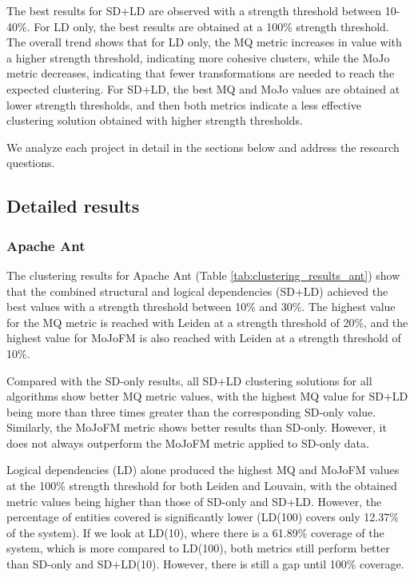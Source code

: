 \documentclass[12pt, a4paper, twoside]{report}
\begin{document}
The best results for SD+LD are observed with a strength threshold between 10-40\%. For LD only, the best results are obtained at a 100\% strength threshold. The overall trend shows that for LD only, the MQ metric increases in value with a higher strength threshold, indicating more cohesive clusters, while the MoJo metric decreases, indicating that fewer transformations are needed to reach the expected clustering. For SD+LD, the best MQ and MoJo values are obtained at lower strength thresholds, and then both metrics indicate a less effective clustering solution obtained with higher strength thresholds.

We analyze each project in detail in the sections below and address the research questions.

\subsection{Detailed results}

\subsubsection{Apache Ant}

The clustering results for Apache Ant (Table \ref{tab:clustering_results_ant}) show that the combined structural and logical dependencies (SD+LD) achieved the best values with a strength threshold between 10\% and 30\%. The highest value for the MQ metric is reached with Leiden at a strength threshold of 20\%, and the highest value for MoJoFM is also reached with Leiden at a strength threshold of 10\%.

Compared with the SD-only results, all SD+LD clustering solutions for all algorithms show better MQ metric values, with the highest MQ value for SD+LD being more than three times greater than the corresponding SD-only value. Similarly, the MoJoFM metric shows better results than SD-only. However, it does not always outperform the MoJoFM metric applied to SD-only data.

Logical dependencies (LD) alone produced the highest MQ and MoJoFM values at the 100\% strength threshold for both Leiden and Louvain, with the obtained metric values being higher than those of SD-only and SD+LD. However, the percentage of entities covered is significantly lower (LD(100) covers only 12.37\% of the system).
If we look at LD(10), where there is a 61.89\% coverage of the system, which is more compared to LD(100), both metrics still perform better than SD-only and SD+LD(10). However, there is still a gap until 100\% coverage.
\end{document}
